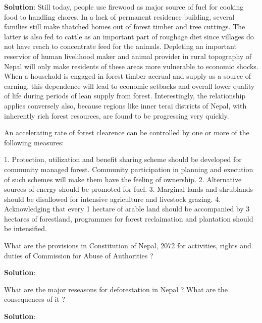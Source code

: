 \documentclass[
]{book}
\newcommand{\question}{\item}
\newenvironment{solution}{ {\bfseries Solution}:}{}
\begin{document}
\begin{questions}
\begin{solution}
Still today, people use firewood as major source of fuel for cooking food to handling chores. In a lack of permanent residence building, several families still make thatched homes out of forest timber and tree cuttings. The latter is also fed to cattle as an important part of roughage diet since villages do not have reach to concentrate feed for the animals. Depleting an important reservior of human livelihood maker and animal provider in rural topography of Nepal will only make residents of these areas more vulnerable to economic shocks. When a household is engaged in forest timber accrual and supply as a source of earning, this dependence will lead to economic setbacks and overall lower quality of life during periods of lean supply from forest. Interestingly, the relationship applies conversely also, because regions like inner terai districts of Nepal, with inherently rich forest resources, are found to be progressing very quickly.

An accelerating rate of forest clearence can be controlled by one or more of the following measures:

1. Protection, utilization and benefit sharing scheme should be developed for community managed forest. Community participation in planning and execution of such schemes will make them have the feeling of ownership.
2. Alternative sources of energy should be promoted for fuel.
3. Marginal lands and shrublands should be disallowed for intensive agriculture and livestock grazing.
4. Acknowledging that every 1 hectare of arable land should be accompanied by 3 hectares of forestland, programmes for forest reclaimation and plantation should be intensified.

\end{solution}

\question What are the provisions in Constitution of Nepal, 2072 for activities, rights and duties of Commission for Abuse of Authorities ?

\begin{solution}

\end{solution}

\question What are the major reseasons for deforestation in Nepal ? What are the consequences of it ?

\begin{solution}


\end{solution}
\end{questions}
\end{document}
